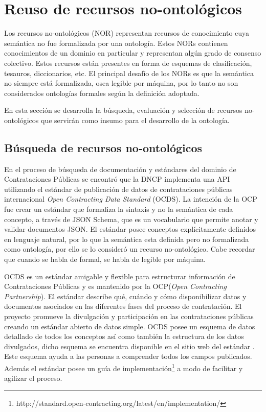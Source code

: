 
\section{Reuso de recursos no-ontológicos}
Los recursos no-ontológicos (NOR)\cite{ReusoRecursoNoOntologico} representan recursos de conocimiento cuya semántica no fue formalizada por una ontología. Estos NORs contienen conocimientos de un dominio en particular y representan algún grado de consenso colectivo. Estos recursos están presentes en forma de esquemas de clasificación, tesauros, diccionarios, etc. El principal desafío de los NORs es que la semántica no siempre está formalizada, osea legible por máquina, por lo tanto no son considerados ontologías formales según la definición adoptada.

En esta sección se desarrolla la búsqueda, evaluación y selección de recursos no-ontológicos que servirán como insumo para el desarrollo de la ontología.

\subsection{Búsqueda de recursos no-ontológicos }

En el proceso de búsqueda de documentación y estándares del dominio de Contrataciones Públicas se encontró que la DNCP implementa una API utilizando el estándar de publicación de datos de contrataciones públicas internacional \textit{Open Contracting Data Standard} (OCDS). La intención de la OCP fue crear un estándar que formaliza la sintaxis y no la semántica de cada concepto, a través de JSON Schema\cite{JSONSche10:online}, que es un vocabulario que permite anotar y validar documentos JSON. El estándar posee conceptos explícitamente definidos en lenguaje natural, por lo que la semántica esta definida pero no formalizada como ontología, por ello se lo consideró un recurso no-ontológico. Cabe recordar que cuando se habla de formal, se habla de legible por máquina. 

OCDS es un estándar amigable y flexible para estructurar información de Contrataciones Públicas y es mantenido por la OCP(\textit{Open Contracting Partnership}). El estándar describe qué, cuándo y cómo disponibilizar datos y documentos asociados en las diferentes fases del proceso de contratación. El proyecto promueve la divulgación y participación en las contrataciones públicas creando un estándar abierto de datos simple. OCDS posee un esquema de datos detallado de todos los conceptos así como también la estructura de los datos divulgados, dicho esquema se encuentra disponible en el sitio web del estándar \cite{OCDSReleaseSchema:online}. Este esquema ayuda a las personas a comprender todos los campos publicados. Además el estándar posee un guía de implementación\footnote{http://standard.open-contracting.org/latest/en/implementation/} a modo de facilitar y agilizar el proceso.

